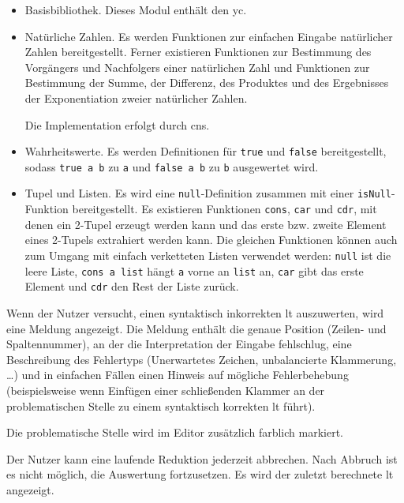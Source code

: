 \documentclass[parskip=full,11pt,twoside]{scrartcl}
\begin{document}
\begin{itemize}
	\item Basisbibliothek. Dieses Modul enthält den \gls{yc}.

	\item Natürliche Zahlen. Es werden Funktionen zur einfachen Eingabe natürlicher
		Zahlen bereitgestellt. Ferner existieren Funktionen zur Bestimmung des Vorgängers
		und Nachfolgers einer natürlichen Zahl und Funktionen zur Bestimmung der Summe,
		der Differenz, des Produktes und des Ergebnisses der Exponentiation zweier
		natürlicher Zahlen.

		Die Implementation erfolgt durch \glspl{cn}.

	\item Wahrheitswerte. Es werden Definitionen für \texttt{true} und \texttt{false}
		bereitgestellt, sodass \texttt{true a b} zu \texttt{a} und \texttt{false a b}
		zu \texttt{b} ausgewertet wird.

	\item Tupel und Listen. Es wird eine \texttt{null}-Definition zusammen mit einer
		\texttt{isNull}-Funktion bereitgestellt. Es existieren Funktionen
		\texttt{cons}, \texttt{car} und \texttt{cdr}, %
		mit denen ein 2-Tupel erzeugt werden kann und das erste bzw. zweite Element
		eines 2-Tupels extrahiert werden kann. Die gleichen Funktionen können auch zum
		Umgang mit einfach verketteten Listen verwendet werden: \texttt{null} ist die
		leere Liste, \texttt{cons a list} hängt \texttt{a} vorne an \texttt{list} an,
		\texttt{car} gibt das erste Element und \texttt{cdr} den Rest der Liste zurück.

\end{itemize}

Wenn der Nutzer versucht, einen syntaktisch inkorrekten \gls{lt} auszuwerten,
wird eine Meldung angezeigt. Die Meldung enthält die genaue Position (Zeilen-
und Spaltennummer), an der die Interpretation der Eingabe fehlschlug, eine Beschreibung
des Fehlertyps (Unerwartetes Zeichen, unbalancierte Klammerung, \ldots) und in einfachen
Fällen einen Hinweis auf mögliche Fehlerbehebung (beispielsweise wenn Einfügen einer
schließenden Klammer an der problematischen Stelle zu einem syntaktisch korrekten
\gls{lt} führt).

Die problematische Stelle wird im Editor zusätzlich farblich markiert.

Der Nutzer kann eine laufende Reduktion jederzeit abbrechen.
Nach Abbruch ist es nicht möglich, die Auswertung fortzusetzen.
Es wird der zuletzt berechnete \gls{lt} angezeigt.
\end{document}

